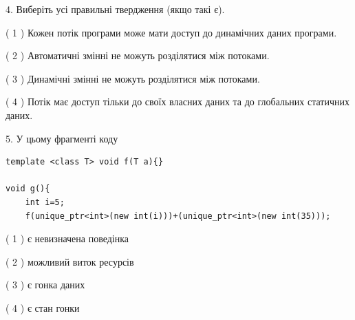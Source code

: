 \documentclass[12pt, ukrainian]{article}
\begin{document}
\begin {large}
{%
4. Виберіть усі правильні твердження (якщо такі є).\par
\vspace{2mm}

( 1 ) Кожен потік програми може мати доступ до динамічних даних програми.%

( 2 ) Автоматичні змінні не можуть розділятися між потоками.%

( 3 ) Динамічні змінні не можуть розділятися між потоками.%

( 4 ) Потік має доступ тільки до своїх власних даних та до глобальних статичних даних.%


5. У цьому фрагменті коду
\begin{verbatim}
template <class T> void f(T a){}

void g(){
    int i=5;
    f(unique_ptr<int>(new int(i)))+(unique_ptr<int>(new int(35)));
\end{verbatim}
( 1 ) є невизначена поведінка%

( 2 ) можливий виток ресурсів%

( 3 ) є гонка даних%

( 4 ) є стан гонки%
}
\end {large}
\end{document}
